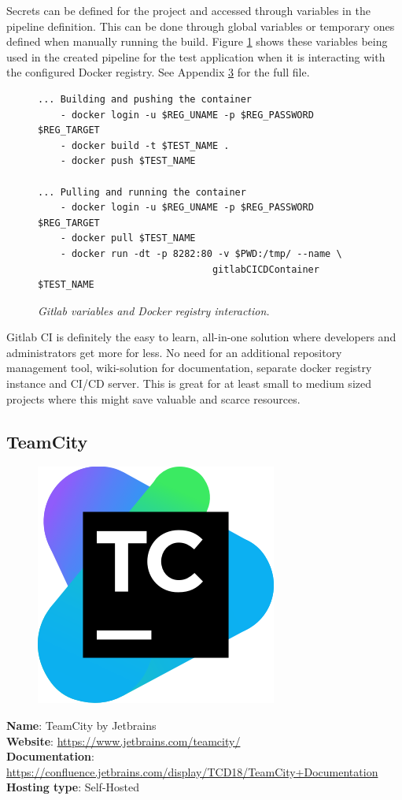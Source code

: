 Secrets can be defined for the project and accessed through variables in the pipeline definition. This can be done through global variables or temporary ones defined when manually running the build. Figure \ref{fig:gitlab-vars} shows these variables being used in the created pipeline for the test application when it is interacting with the configured Docker registry. See Appendix \hyperref[chapter:appendix-gitlab]{3} for the full file.
\begin{figure}[H]
\centering
\begin{lstlisting}[frame=single, basicstyle=\small, linewidth=\textwidth]
... Building and pushing the container
    - docker login -u $REG_UNAME -p $REG_PASSWORD $REG_TARGET 
    - docker build -t $TEST_NAME .
    - docker push $TEST_NAME
    
... Pulling and running the container
    - docker login -u $REG_UNAME -p $REG_PASSWORD $REG_TARGET
    - docker pull $TEST_NAME
    - docker run -dt -p 8282:80 -v $PWD:/tmp/ --name \ 
                               gitlabCICDContainer $TEST_NAME
\end{lstlisting}
\caption{\textit{Gitlab variables and Docker registry interaction.}}
\label{fig:gitlab-vars}
\end{figure}

Gitlab CI is definitely the easy to learn, all-in-one solution where developers and administrators get more for less. No need for an additional repository management tool, wiki-solution for documentation, separate docker registry instance and CI/CD server. This is great for at least small to medium sized projects where this might save valuable and scarce resources.

\pagebreak

\subsection{TeamCity}
\begin{figure}
    \vspace{-50pt}
    \includegraphics[width=.25\textwidth]{figures/brand/teamcity.png}  
    \vspace{-30pt}
\end{figure}
\textbf{Name}: TeamCity by Jetbrains\\
\textbf{Website}: \url{https://www.jetbrains.com/teamcity/}\\
\textbf{Documentation}: \url{https://confluence.jetbrains.com/display/TCD18/TeamCity+Documentation}\\
\textbf{Hosting type}: Self-Hosted

